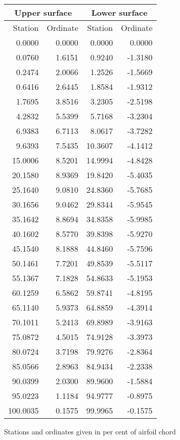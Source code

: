 \documentclass[11pt]{book}
\begin{document}
 \hspace{4mm}
 \begin{tabular}{|r|r|r|r|} \hline 
 \multicolumn{2}{|c|}{Upper surface} & \multicolumn{2}{|c|}{Lower surface} \\
 \hline
 Station & Ordinate & Station & Ordinate \\
 \hline
0.0000 & 0.0000 & 0.0000 & 0.0000 \\
0.0760 & 1.6151 & 0.9240 & -1.3180 \\
0.2474 & 2.0066 & 1.2526 & -1.5669 \\
0.6416 & 2.6445 & 1.8584 & -1.9312 \\
1.7695 & 3.8516 & 3.2305 & -2.5198 \\
4.2832 & 5.5399 & 5.7168 & -3.2304 \\
6.9383 & 6.7113 & 8.0617 & -3.7282 \\
9.6393 & 7.5435 & 10.3607 & -4.1412 \\
15.0006 & 8.5201 & 14.9994 & -4.8428 \\
20.1580 & 8.9369 & 19.8420 & -5.4035 \\
25.1640 & 9.0810 & 24.8360 & -5.7685 \\
30.1656 & 9.0462 & 29.8344 & -5.9545 \\
35.1642 & 8.8694 & 34.8358 & -5.9985 \\
40.1602 & 8.5770 & 39.8398 & -5.9270 \\
45.1540 & 8.1888 & 44.8460 & -5.7596 \\
50.1461 & 7.7201 & 49.8539 & -5.5117 \\
55.1367 & 7.1828 & 54.8633 & -5.1953 \\
60.1259 & 6.5862 & 59.8741 & -4.8195 \\
65.1140 & 5.9373 & 64.8859 & -4.3914 \\
70.1011 & 5.2413 & 69.8989 & -3.9163 \\
75.0872 & 4.5015 & 74.9128 & -3.3973 \\
80.0724 & 3.7198 & 79.9276 & -2.8364 \\
85.0566 & 2.8963 & 84.9434 & -2.2338 \\
90.0399 & 2.0300 & 89.9600 & -1.5884 \\
95.0223 & 1.1184 & 94.9777 & -0.8975 \\
100.0035 & 0.1575 & 99.9965 & -0.1575 \\
 \hline 
 \end{tabular}
 \vspace{8mm}

Stations and ordinates given in per cent of airfoil chord
\end{document}
